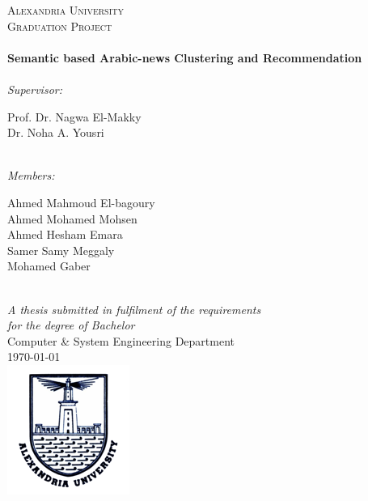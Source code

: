 \documentclass[11pt, a4paper, oneside]{Thesis} %
\begin{document}
\begin{titlepage}
\begin{center}

\textsc{\LARGE Alexandria University}\\[1.5cm] %
\textsc{\Large Graduation Project}\\[0.5cm] %

\HRule \\[0.4cm] %
{\huge \bfseries Semantic based Arabic-news Clustering and Recommendation}\\[0.4cm] %
\HRule \\[1cm] %

\large \textit{Supervisor:}\\[0.4cm]
\begin{minipage}{0.4\textwidth}
\begin{center} \large
Prof. Dr. Nagwa El-Makky\\
Dr. Noha A. Yousri 
\end{center}
\end{minipage}\\[1cm]
 
\large \textit{Members:}\\[0.4cm]
\begin{minipage}{0.4\textwidth}
\begin{center} \large
Ahmed Mahmoud El-bagoury \\ Ahmed Mohamed Mohsen \\ 
Ahmed Hesham Emara \\ Samer Samy Meggaly \\
Mohamed Gaber
\end{center}
\end{minipage}\\[1cm]
 
\large \textit{A thesis submitted in fulfilment of the requirements\\ for the degree of Bachelor }\\[0.4cm] %
Computer \& System Engineering Department\\[0.7cm] %
 
{\large \today}\\[0.4cm] %
\includegraphics{./Figures/Logo_Alexandria_University.png} %
\vfill 
\end{center}

\end{titlepage}
\end{document}
